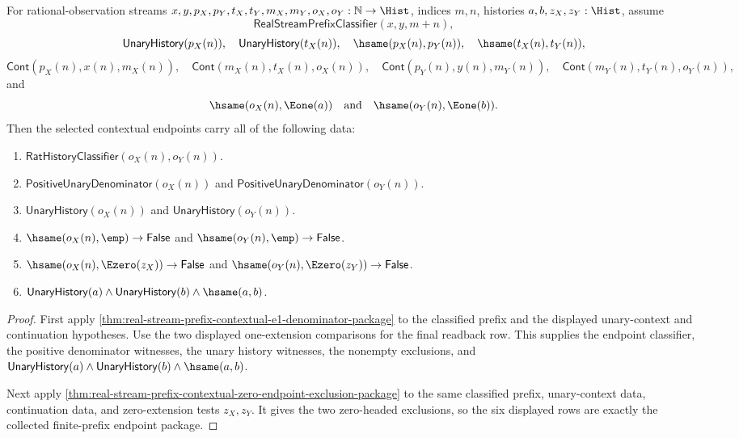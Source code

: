 \begin{theorem}
\label{thm:real-stream-prefix-contextual-full-endpoint-package}
For rational-observation streams
$x,y,p_X,p_Y,t_X,t_Y,m_X,m_Y,o_X,o_Y:\mathbb{N}\to\Hist$, indices $m,n$,
histories $a,b,z_X,z_Y:\Hist$, assume
$$
\mathsf{RealStreamPrefixClassifier}(x,y,m+n),
$$
$$
\mathsf{UnaryHistory}(p_X(n)),\quad
\mathsf{UnaryHistory}(t_X(n)),\quad
\hsame(p_X(n),p_Y(n)),\quad
\hsame(t_X(n),t_Y(n)),
$$
$$
\mathsf{Cont}(p_X(n),x(n),m_X(n)),\quad
\mathsf{Cont}(m_X(n),t_X(n),o_X(n)),
\quad
\mathsf{Cont}(p_Y(n),y(n),m_Y(n)),\quad
\mathsf{Cont}(m_Y(n),t_Y(n),o_Y(n)),
$$
and
$$
\hsame(o_X(n),\Eone(a))\quad\text{and}\quad \hsame(o_Y(n),\Eone(b)).
$$
Then the selected contextual endpoints carry all of the following data:
\begin{enumerate}
\item $\mathsf{RatHistoryClassifier}(o_X(n),o_Y(n))$.
\item $\mathsf{PositiveUnaryDenominator}(o_X(n))$ and
$\mathsf{PositiveUnaryDenominator}(o_Y(n))$.
\item $\mathsf{UnaryHistory}(o_X(n))$ and $\mathsf{UnaryHistory}(o_Y(n))$.
\item $\hsame(o_X(n),\emp)\to\mathsf{False}$ and
$\hsame(o_Y(n),\emp)\to\mathsf{False}$.
\item $\hsame(o_X(n),\Ezero(z_X))\to\mathsf{False}$ and
$\hsame(o_Y(n),\Ezero(z_Y))\to\mathsf{False}$.
\item $\mathsf{UnaryHistory}(a)\land\mathsf{UnaryHistory}(b)\land\hsame(a,b)$.
\end{enumerate}
\end{theorem}
\begin{proof}
First apply
\autoref{thm:real-stream-prefix-contextual-e1-denominator-package} to the
classified prefix and the displayed unary-context and continuation hypotheses.
Use the two displayed one-extension comparisons for the final readback row. This
supplies the endpoint classifier, the positive denominator witnesses, the unary
history witnesses, the nonempty exclusions, and
$\mathsf{UnaryHistory}(a)\land\mathsf{UnaryHistory}(b)\land\hsame(a,b)$.

Next apply
\autoref{thm:real-stream-prefix-contextual-zero-endpoint-exclusion-package} to
the same classified prefix, unary-context data, continuation data, and
zero-extension tests $z_X,z_Y$. It gives the two zero-headed exclusions, so the
six displayed rows are exactly the collected finite-prefix endpoint package.
\end{proof}

